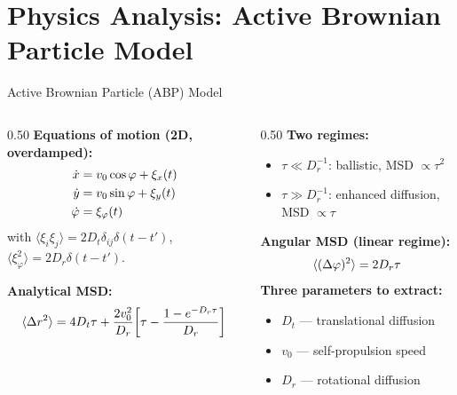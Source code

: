 
\section[Physics Analysis]{Physics Analysis: Active Brownian Particle Model}

\begin{frame}{Active Brownian Particle (ABP) Model}
\begin{columns}
\begin{column}{0.50\textwidth}
\textbf{Equations of motion (2D, overdamped):}
\begin{align*}\small
    \dot{x} &= v_0 \cos\varphi + \xi_x(t) \\
    \dot{y} &= v_0 \sin\varphi + \xi_y(t) \\
    \dot{\varphi} &= \xi_\varphi(t)
\end{align*}
\small with $\langle\xi_i\xi_j\rangle = 2D_t\delta_{ij}\delta(t{-}t')$,\;
$\langle\xi_\varphi^2\rangle = 2D_r\delta(t{-}t')$.

\smallskip
\textbf{Analytical MSD:}
\begin{equation*}\small
    \langle \Delta r^2 \rangle = 4D_t\tau + \frac{2v_0^2}{D_r}\!\left[\tau - \frac{1-e^{-D_r\tau}}{D_r}\right]
\end{equation*}
\end{column}
\begin{column}{0.50\textwidth}
\textbf{Two regimes:}
\begin{itemize}\small
    \item $\tau \ll D_r^{-1}$: ballistic, MSD $\propto \tau^2$
    \item $\tau \gg D_r^{-1}$: enhanced diffusion, MSD $\propto \tau$
\end{itemize}
\smallskip
\textbf{Angular MSD (linear regime):}
\begin{equation*}\small
    \langle (\Delta\varphi)^2 \rangle = 2D_r\tau
\end{equation*}
\smallskip
\textbf{Three parameters to extract:}
\begin{itemize}\small
    \item $D_t$ — translational diffusion
    \item $v_0$ — self-propulsion speed
    \item $D_r$ — rotational diffusion
\end{itemize}
\end{column}
\end{columns}
\end{frame}

